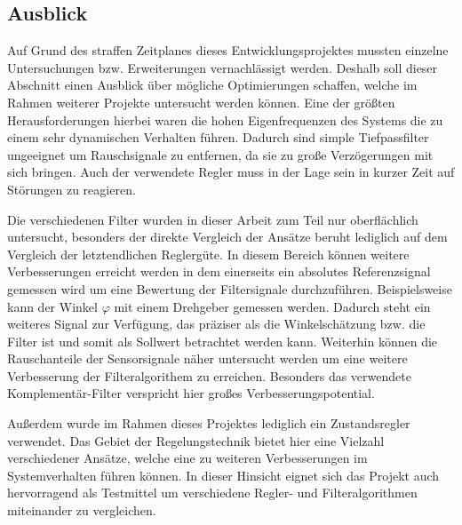 \subsection{Ausblick}
Auf Grund des straffen Zeitplanes dieses Entwicklungsprojektes mussten einzelne Untersuchungen bzw. Erweiterungen vernachlässigt werden. Deshalb soll dieser Abschnitt einen Ausblick über mögliche Optimierungen schaffen, welche im Rahmen weiterer Projekte untersucht werden können. Eine der größten Herausforderungen hierbei waren die hohen Eigenfrequenzen des Systems die zu einem sehr dynamischen Verhalten führen. Dadurch sind simple Tiefpassfilter ungeeignet um Rauschsignale zu entfernen, da sie zu große Verzögerungen mit sich bringen. Auch der verwendete Regler muss in der Lage sein in kurzer Zeit auf Störungen zu reagieren.

Die verschiedenen Filter wurden in dieser Arbeit zum Teil nur oberflächlich untersucht, besonders der direkte Vergleich der Ansätze beruht lediglich auf dem Vergleich der letztendlichen Reglergüte. In diesem Bereich können weitere Verbesserungen erreicht werden in dem einerseits ein absolutes Referenzsignal gemessen wird um eine Bewertung der Filtersignale durchzuführen. Beispielsweise kann der Winkel $\varphi$ mit einem Drehgeber gemessen werden. Dadurch steht ein weiteres Signal zur Verfügung, das präziser als die Winkelschätzung bzw. die Filter ist und somit als Sollwert betrachtet werden kann. Weiterhin können die Rauschanteile der Sensorsignale näher untersucht werden um eine weitere Verbesserung der Filteralgorithem zu erreichen. Besonders das verwendete Komplementär-Filter verspricht hier großes Verbesserungspotential.

Außerdem wurde im Rahmen dieses Projektes lediglich ein Zustandsregler verwendet. Das Gebiet der Regelungstechnik bietet hier eine Vielzahl verschiedener Ansätze, welche eine zu weiteren Verbesserungen im Systemverhalten führen können. In dieser Hinsicht eignet sich das Projekt auch hervorragend als Testmittel um verschiedene Regler- und Filteralgorithmen miteinander zu vergleichen.